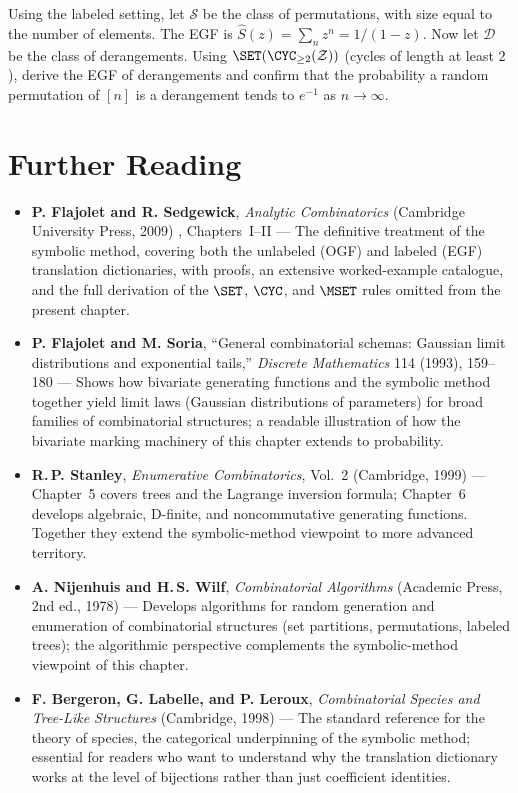 \begin{exercise}
Using the labeled setting, let $\mathcal{S}$ be the class of permutations, with
size equal to the number of elements.  The EGF is $\hat S(z) = \sum_n z^n = 1/(1-z)$.
Now let $\mathcal{D}$ be the class of derangements.  Using $\SET(\CYC_{\ge
2}(\mathcal{Z}))$ (cycles of length at least $2$), derive the EGF of derangements
and confirm that the probability a random permutation of $[n]$ is a derangement
tends to $e^{-1}$ as $n \to \infty$.
\end{exercise}

\section*{Further Reading}

\begin{itemize}
  \item \textbf{P. Flajolet and R. Sedgewick}, \emph{Analytic Combinatorics} (Cambridge University Press, 2009) \cite{FlajoletSedgewick2009}, Chapters~I--II --- The definitive treatment of the symbolic method, covering both the unlabeled (OGF) and labeled (EGF) translation dictionaries, with proofs, an extensive worked-example catalogue, and the full derivation of the $\SET$, $\CYC$, and $\MSET$ rules omitted from the present chapter.

  \item \textbf{P. Flajolet and M. Soria}, ``General combinatorial schemas: Gaussian limit distributions and exponential tails,'' \emph{Discrete Mathematics} 114 (1993), 159--180 --- Shows how bivariate generating functions and the symbolic method together yield limit laws (Gaussian distributions of parameters) for broad families of combinatorial structures; a readable illustration of how the bivariate marking machinery of this chapter extends to probability.

  \item \textbf{R.\,P. Stanley}, \emph{Enumerative Combinatorics}, Vol.~2 (Cambridge, 1999) --- Chapter~5 covers trees and the Lagrange inversion formula; Chapter~6 develops algebraic, D-finite, and noncommutative generating functions. Together they extend the symbolic-method viewpoint to more advanced territory.

  \item \textbf{A. Nijenhuis and H.\,S. Wilf}, \emph{Combinatorial Algorithms} (Academic Press, 2nd ed., 1978) \cite{NijenhuisWilf1978} --- Develops algorithms for random generation and enumeration of combinatorial structures (set partitions, permutations, labeled trees); the algorithmic perspective complements the symbolic-method viewpoint of this chapter.

  \item \textbf{F. Bergeron, G. Labelle, and P. Leroux}, \emph{Combinatorial Species and Tree-Like Structures} (Cambridge, 1998) --- The standard reference for the theory of species, the categorical underpinning of the symbolic method; essential for readers who want to understand why the translation dictionary works at the level of bijections rather than just coefficient identities.
\end{itemize}
